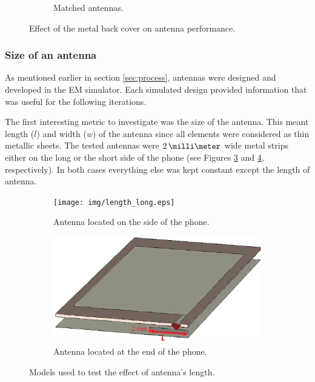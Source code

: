 \begin{figure}[H]
\begin{subfigure}[b]{0.49\textwidth}
        \caption{Matched antennas.}
        \label{fig:metal_vs_nometal_matched}
    \end{subfigure}
    \caption{Effect of the metal back cover on antenna performance.}
    \label{fig:metal_vs_nometal_results}
\end{figure}



\subsubsection{Size of an antenna}
\label{sec:antenna_size}
As mentioned earlier in section \ref{sec:process}, antennas were designed and developed in the EM simulator. Each simulated design provided information that was useful for the following iterations. 

The first interesting metric to investigate was the size of the antenna. This meant length ($l$) and width ($w$) of the antenna since all elements were considered as thin metallic sheets. The tested antennas were $2\,\milli\meter$ wide metal strips either on the long or the short side of the phone (see Figures \ref{fig:ant_length_long} and \ref{fig:ant_length_short}, respectively). In both cases everything else was kept constant except the length of antenna. 

\begin{figure}[H]
    \centering
    \begin{subfigure}[b]{0.49\textwidth}
        \texttt{[image: img/length\_long.eps]}
        \caption{Antenna located on the side of the phone.}
        \label{fig:ant_length_long}
    \end{subfigure}
    
    \begin{subfigure}[b]{0.49\textwidth}
        \includegraphics[width=\textwidth]{img/length_short.eps}
        \caption{Antenna located at the end of the phone.}
        \label{fig:ant_length_short}
    \end{subfigure}
    \caption{Models used to test the effect of antenna's length.}
    \label{fig:ant_length_model}
\end{figure}

